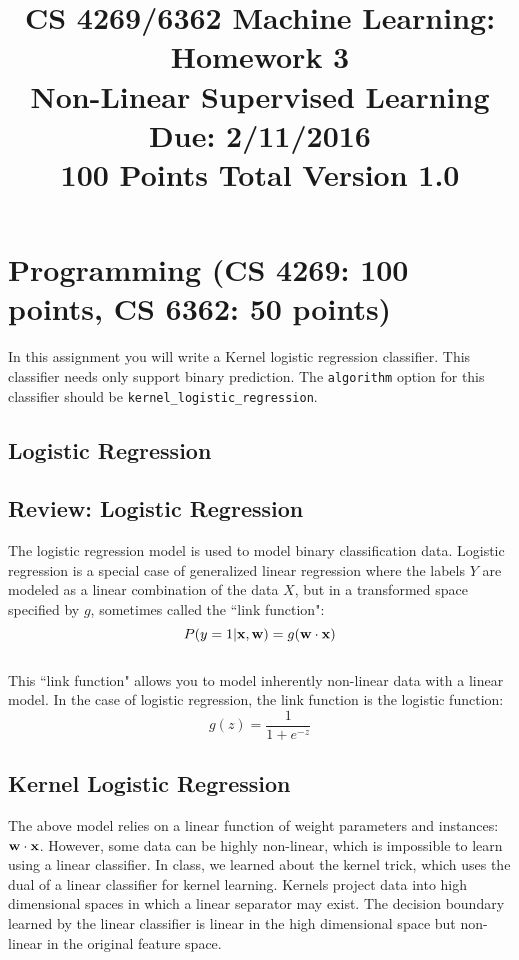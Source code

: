 \documentclass[11pt]{article}
\title{CS 4269/6362 Machine Learning: Homework 3\\Non-Linear Supervised Learning\\
\Large{Due: 2/11/2016}\\
100 Points Total \hspace{1cm} Version 1.0}
\author{}
\date{}
\newcommand{\vw}{{\bf w}}
\newcommand{\vx}{{\bf x}}
\newcommand{\code}[1]{{\footnotesize \tt #1}}
\begin{document}
\large
\maketitle
\thispagestyle{headings}

\vspace{-.5in}
\section{Programming (CS 4269: 100 points, CS 6362: 50 points)}
In this assignment you will write a Kernel
logistic regression classifier. This classifier needs only support
binary prediction.
The \code{algorithm} option for this classifier should be \code{kernel\_logistic\_regression}.

\subsection{Logistic Regression}

\subsection{Review: Logistic Regression}

The logistic regression model is used to model binary classification data. Logistic regression is a special case of generalized linear regression where the labels $Y$ are modeled as a linear combination of the data $X$, but in a transformed space specified by $g$, sometimes called the ``link function":
\begin{equation}
P(y=1 | \vx, \vw) = g(\vw \cdot \vx)
\end{equation}
\\
This ``link function" allows you to model inherently non-linear data with a linear model. In the case of logistic regression, the link function is the logistic function:
\begin{equation}
g(z) = \frac{1}{1 + e^{-z}}
\end{equation}

\subsection{Kernel Logistic Regression}

The above model relies on a linear function of weight parameters and instances: $\vw \cdot \vx$. However, some data can be highly non-linear, which is impossible to learn using a linear classifier. In class, we learned about the kernel trick, which uses the dual of a linear classifier for kernel learning. Kernels project data into high dimensional spaces in which a linear separator may exist. The decision boundary learned by the linear classifier is linear in the high dimensional space but non-linear in the original feature space.
\end{document}
